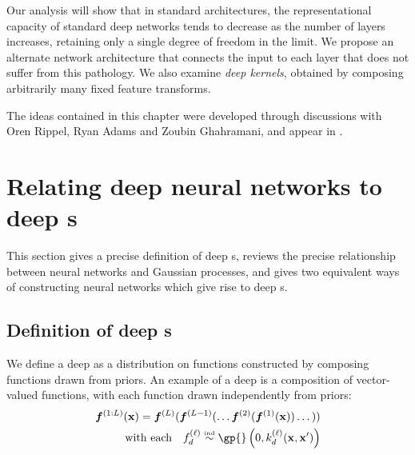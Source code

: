 Our analysis will show that in standard architectures, the representational capacity of standard deep networks tends to decrease as the number of layers increases, retaining only a single degree of freedom in the limit.
We propose an alternate network architecture that connects the input to each layer that does not suffer from this pathology.
We also examine \emph{deep kernels}, obtained by composing arbitrarily many fixed feature transforms.

The ideas contained in this chapter were developed through discussions with Oren Rippel, Ryan Adams and Zoubin Ghahramani, and appear in \citet{DuvRipAdaGha14}.




\section{Relating deep neural networks to deep \sgp{}s}
\label{sec:relating}

This section gives a precise definition of deep \gp{}s, reviews the precise relationship between neural networks and Gaussian processes, and gives two equivalent ways of constructing neural networks which give rise to deep \gp{}s.



\subsection{Definition of deep \sgp{}s}

We define a deep \gp{} as a distribution on functions constructed by composing functions drawn from \gp{} priors.
An example of a deep \gp{} is a composition of vector-valued functions, with each function drawn independently from \gp{} priors:
%
\begin{align}
\vf^{(1:L)}(\vx) = \vf^{(L)}(\vf^{(L-1)}(\dots \vf^{(2)}(\vf^{(1)}(\vx)) \dots)) \\
\textnormal{with each} \quad f_d^{(\layerindex)}  \simind \gp{} \left( 0, k^{(\layerindex)}_d(\vx, \vx') \right) \nonumber
\label{eq:deep-gp}
\end{align}
%

